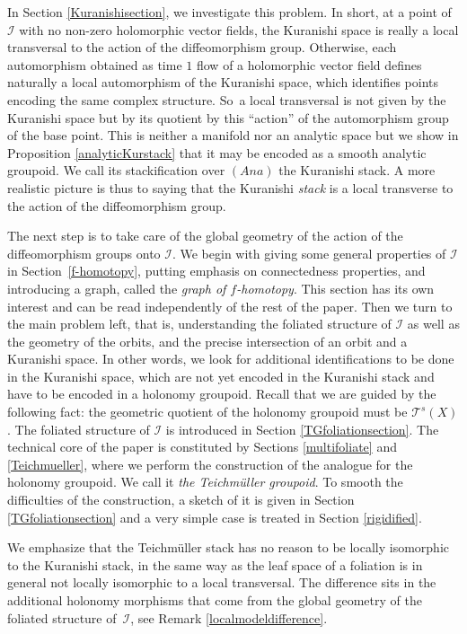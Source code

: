 \documentclass[10pt]{amsart}
\let\mathcal\mathscr
\newcommand{\Ana}{\mathit{Ana}}
\theoremstyle{plain}
\theoremstyle{definition}
\theoremstyle{remark}
\numberwithin{equation}{section}
\newcommand{\cI}{\mathcal{I}}
\begin{document}
In Section \ref{Kuranishisection}, we investigate this problem. In short, at a point of $\cI$ with no non-zero holomorphic vector fields, the Kuranishi space is really a local transversal to the action of the diffeomorphism group. Otherwise, each automorphism obtained as time $1$ flow of a holomorphic vector field defines naturally a local automorphism of the Kuranishi space, which identifies points encoding the same complex structure. So~a local transversal is not given by the Kuranishi space but by its quotient by this ``action'' of the automorphism group of the base point. This is neither a manifold nor an analytic space but we show in Proposition \ref{analyticKurstack} that it may be encoded as a smooth analytic groupoid. We call its stackification over $(\Ana)$ the Kuranishi stack. A more realistic picture is thus to saying that the Kuranishi \emph{stack} is a local transverse to the action of the diffeomorphism group.

The next step is to take care of the global geometry of the action of the diffeomorphism groups onto $\cI$. We begin with giving some general properties of $\cI$ in Section~\ref{f-homotopy}, putting emphasis on connectedness properties, and introducing a graph, called the \emph{graph of $f$-homotopy}. This section has its own interest and can be read independently of the rest of the paper. Then we turn to the main problem left, that is, understanding the foliated structure of $\cI$ as well as the geometry of the orbits, and the precise intersection of an orbit and a Kuranishi space. In other words, we look for additional identifications to be done in the Kuranishi space, which are not yet encoded in the Kuranishi stack and have to be encoded in a holonomy groupoid. Recall that we are guided by the following fact: the geometric quotient of the holonomy groupoid must be $\mathcal T^s(X)$. The foliated structure of $\cI$ is introduced in Section \ref{TGfoliationsection}. The technical core of the paper is constituted by Sections \ref{multifoliate} and \ref{Teichmueller}, where we perform the construction of the analogue for the holonomy groupoid. We call it \emph{the Teichmüller groupoid}. To smooth the difficulties of the construction, a sketch of it is given in Section \ref{TGfoliationsection} and a very simple case is treated in Section \ref{rigidified}.\enlargethispage{.5\baselineskip}%

We emphasize that the Teichmüller stack has no reason to be locally isomorphic to the Kuranishi stack, in the same way as the leaf space of a foliation is in general not locally isomorphic to a local transversal. The difference sits in the additional holonomy morphisms that come from the global geometry of the foliated structure of~$\cI$, see Remark \ref{localmodeldifference}.
\end{document}
